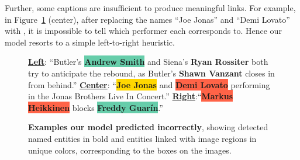 Further, some captions are insufficient to produce meaningful links. For example, in Figure~\ref{fig:limitations} (center), after replacing the names ``Joe Jonas'' and ``Demi Lovato'' with \NAME, it is impossible to tell which performer each corresponds to. Hence our model resorts to a simple left-to-right heuristic.

\begin{figure}
  \hfill
{} 
\hfill
{} 
\newline
 {\leftskip=0.1pt   \footnotesize{
  \textbf{\underline{Left}}: ``Butler's \colorbox{mediumaquamarine}{\textbf{Andrew Smith}} and Siena's \textbf{Ryan Rossiter} both try to anticipate the rebound, as Butler's \textbf{Shawn Vanzant} closes in from behind.''
  \newline
  \textbf{\underline{Center}}: ``\colorbox{gold}{\textbf{Joe Jonas}} and \colorbox{tomato}{\textbf{Demi Lovato}} performing in the Jonas Brothers Live In Concert.''}
  \newline
  \textbf{\underline{Right}}:``\colorbox{tomato}{\textbf{Markus Heikkinen}} blocks \colorbox{mediumaquamarine}{\textbf{Freddy Guarín}}.''}
  \vspace{3pt}
  \caption{
  \textbf{Examples our model predicted incorrectly}, showing detected named entities in bold and entities linked with image regions in unique colors, corresponding to the boxes on the images. }\label{fig:limitations}
\end{figure}

 